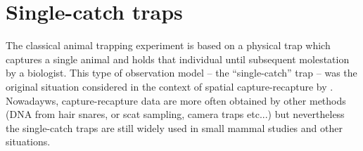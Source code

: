 \section{Single-catch traps}
\label{poisson-mn.sec.singlecatch}

The classical animal trapping experiment is based on a physical trap
which captures a single animal and holds that individual until
subsequent molestation by a biologist.
This type of observation model -- the ``single-catch'' trap --
was the original situation considered in the context of spatial
capture-recapture  by
\citet{efford:2004}. Nowadayws, capture-recapture data are more often
obtained by other methods (DNA from hair snares, or scat sampling,
camera traps etc...) but nevertheless the single-catch traps are still
widely used in small mammal studies \citep{converse_1996,
  converse_royle:2012} and other situations.

